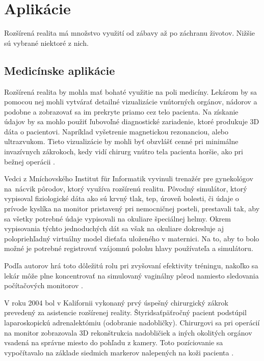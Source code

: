 \chapter{Aplikácie}

Rozšírená realita má množstvo využití od zábavy až po záchranu životov. Nižšie sú vybrané niektoré z nich.

\section{Medicínske aplikácie}

Rozšírená realita by mohla mať bohaté využitie na poli medicíny. Lekárom by sa pomocou nej mohli vytvárať detailné vizualizácie vnútorných orgánov, nádorov a podobne a zobrazovať sa im prekryte priamo cez telo pacienta. Na získanie údajov by sa mohlo použiť ľubovoľné diagnostické zariadenie, ktoré produkuje 3D dáta o pacientovi. Napríklad vyšetrenie magnetickou rezonanciou, alebo ultrazvukom. Tieto vizualizácie by mohli byť obzvlášť cenné pri minimálne invazívnych zákrokoch, kedy vidí chirurg vnútro tela pacienta horšie, ako pri bežnej operácii \cite{Azuma97}.

Vedci z Mníchovského Institut für Informatik vyvinuli trenažér pre gynekológov na~nácvik pôrodov, ktorý využíva rozšírenú realitu. Pôvodný simulátor, ktorý vypisoval fiziologické dáta ako sú krvný tlak, tep, úroveň bolesti, či údaje o prívode kyslíka na monitor pristavený pri nemocničnej posteli, prestavali tak, aby sa všetky potrebné údaje vypisovali na okuliare špeciálnej helmy. Okrem vypisovania týchto jednoduchých dát sa však na okuliare dokresluje aj polopriehľadný virtuálny model dieťaťa uloženého v maternici. Na to, aby to bolo možné je potrebné registrovať vzájomnú polohu hlavy používateľa a simulátoru.


Podľa autorov hrá toto dôležitú rolu pri zvyšovaní efektivity tréningu, nakoľko sa lekár môže plne koncentrovať na simulovaný vaginálny pôrod namiesto sledovania počítačových monitorov \cite{Sielhorst04}.

V roku 2004 bol v Kalifornii vykonaný prvý úspešný chirurgický zákrok prevedený za asistencie rozšírenej reality. Štyridsaťpäťročný pacient podstúpil laparoskopickú adrenalektómiu (odobranie nadobličky). Chirurgovi sa pri operácií na monitor zobrazovala 3D rekonštrukcia nadobličiek a iných okolitých orgánov vsadená na správne miesto do pohľadu z kamery. Toto pozíciovanie sa vypočítavalo na základe siedmich markerov nalepených na koži pacienta \cite{Marescaux04}.

